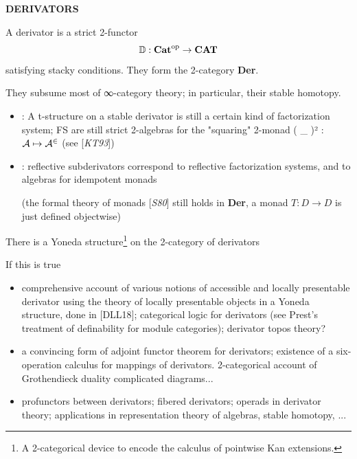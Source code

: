 \documentclass{beamer}
\begin{document}
%
%
%
%
%
%
%
\begin{frame}
  \Huge\centering \bfseries DERIVATORS
\end{frame}
%
\begin{frame}
  A \alert{derivator} is a strict 2-functor
  \[\mathbb{D} : {\bf Cat}^\text{op} \to {\bf CAT} \]
  satisfying stacky conditions. They form the 2-category \textbf{Der}.

  They subsume most of ∞-category theory; in particular, their stable homotopy.
  \begin{itemize}
    \item<2-> [{[\alert{LV17}]}] : A t-structure on a stable derivator is still a certain kind of factorization system; FS are still \alert{strict 2-algebras} for the "squaring" 2-monad ( \_ )² : $\cal A \mapsto \cal A^2$ (see [\emph{KT93}])

    \item<3->  [{[\alert{Lor18}]}] : reflective subderivators correspond to reflective factorization systems, and to algebras for idempotent monads

    (the \alert{formal theory of monads} [\emph{S80}] still holds in \textbf{Der}, a monad $T : D \to D$ is just defined objectwise)
  \end{itemize}
\end{frame}
%
\begin{frame}
  There is a \alert{Yoneda structure}\footnote{A 2-categorical device to encode the calculus of pointwise Kan extensions.} on the 2-category of derivators

  If this is true
\begin{itemize}
\item<2-> comprehensive account of various notions of \alert{accessible} and \alert{locally presentable} derivator using the theory of locally presentable objects in a Yoneda structure, done in [\alert{DLL18}]; categorical logic for derivators (see Prest's treatment of \alert{definability} for module categories); derivator topos theory?
\item<3-> a convincing form of \alert{adjoint functor theorem} for derivators; existence of a six-operation calculus for mappings of derivators. 2-categorical account of Grothendieck duality complicated diagrams...
\item<4-> \alert{profunctors} between derivators; fibered derivators; \alert{operads} in derivator theory; applications in representation theory of algebras, stable homotopy, ...
\end{itemize}
\end{frame}
\end{document}
